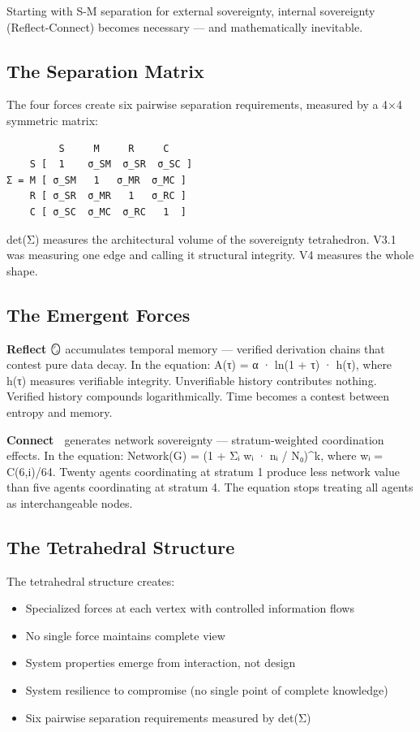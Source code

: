 \documentclass[
]{article}
\begin{document}
Starting with S-M separation for external sovereignty, internal
sovereignty (Reflect-Connect) becomes necessary --- and mathematically
inevitable.

\subsection{The Separation Matrix}\label{the-separation-matrix}

The four forces create six pairwise separation requirements, measured by
a 4×4 symmetric matrix:

\begin{verbatim}
         S     M     R     C
    S [  1    σ_SM  σ_SR  σ_SC ]
Σ = M [ σ_SM   1   σ_MR  σ_MC ]
    R [ σ_SR  σ_MR   1   σ_RC ]
    C [ σ_SC  σ_MC  σ_RC   1  ]
\end{verbatim}

det(Σ) measures the architectural volume of the sovereignty tetrahedron.
V3.1 was measuring one edge and calling it structural integrity. V4
measures the whole shape.

\subsection{The Emergent Forces}\label{the-emergent-forces}

\textbf{Reflect} 🪞 accumulates temporal memory --- verified derivation
chains that contest pure data decay. In the equation: A(τ) = α · ln(1 +
\textbar τ\textbar) · h(τ), where h(τ) measures verifiable integrity.
Unverifiable history contributes nothing. Verified history compounds
logarithmically. Time becomes a contest between entropy and memory.

\textbf{Connect} 🤝 generates network sovereignty --- stratum-weighted
coordination effects. In the equation: Network(G) = (1 + Σᵢ wᵢ · nᵢ /
N₀)\^{}k, where wᵢ = C(6,i)/64. Twenty agents coordinating at stratum 1
produce less network value than five agents coordinating at stratum 4.
The equation stops treating all agents as interchangeable nodes.

\subsection{The Tetrahedral Structure}\label{the-tetrahedral-structure}

The tetrahedral structure creates:

\begin{itemize}
\item
  Specialized forces at each vertex with controlled information flows
\item
  No single force maintains complete view
\item
  System properties emerge from interaction, not design
\item
  System resilience to compromise (no single point of complete
  knowledge)
\item
  Six pairwise separation requirements measured by det(Σ)
\end{itemize}
\end{document}
